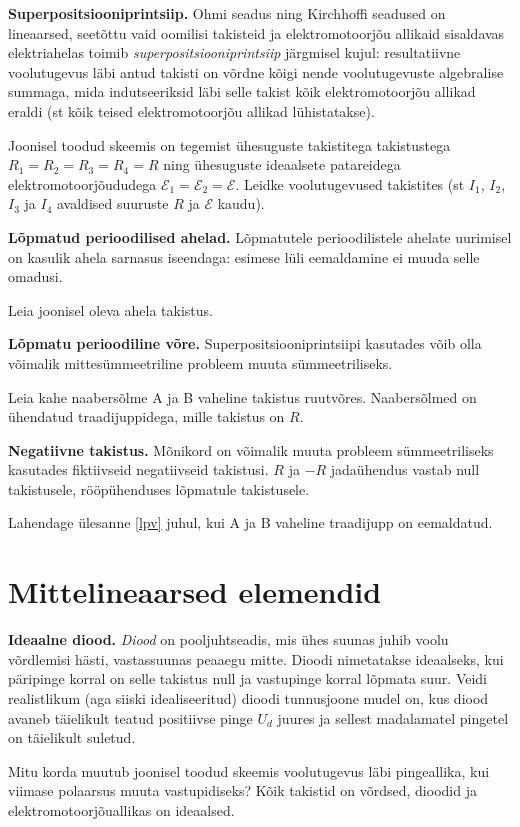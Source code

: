 \documentclass[a4paper,11pt,twocolumn]{article}
\begin{document}
\textbf{Superpositsiooniprintsiip.} Ohmi seadus ning Kirchhoffi seadused on lineaarsed, seetõttu vaid oomilisi takisteid ja elektromotoorjõu allikaid sisaldavas elektriahelas toimib \textit{superpositsiooniprintsiip} järgmisel kujul: resultatiivne voolutugevus läbi antud takisti on võrdne kõigi nende voolutugevuste algebralise summaga, mida indutseeriksid läbi selle takist kõik elektromotoorjõu allikad eraldi (st kõik teised elektromotoorjõu allikad lühistatakse).
\begin{question}[ela4][3.7cm]
	Joonisel toodud skeemis on tegemist ühesuguste takistitega takistustega $ R_1 = R_2 = R_3 = R_4 = R $ ning ühesuguste ideaalsete patareidega elektromotoorjõududega $ \mathcal{E}_1 = \mathcal{E}_2 = \mathcal{E} $. Leidke voolutugevused takistites (st $ I_1 $, $ I_2 $, $ I_3 $ ja $ I_4 $ avaldised suuruste $ R $ ja $ \mathcal{E} $ kaudu).
\end{question}

\textbf{Lõpmatud perioodilised ahelad.} Lõpmatutele perioodilistele ahelate uurimisel on kasulik ahela sarnasus iseendaga: esimese lüli eemaldamine ei muuda selle omadusi.
\begin{question}[ela7][9cm]
	Leia joonisel oleva ahela takistus.
\end{question}

\textbf{Lõpmatu perioodiline võre.} Superpositsiooniprintsiipi kasutades võib olla võimalik mittesümmeetriline probleem muuta sümmeetriliseks.
\begin{question}
	\label{lpv}
	Leia kahe naabersõlme A ja B vaheline takistus ruutvõres. Naabersõlmed on ühendatud traadijuppidega, mille takistus on \( R \).
\end{question}

\textbf{Negatiivne takistus.} Mõnikord on võimalik muuta probleem sümmeetriliseks kasutades fiktiivseid negatiivseid takistusi. \( R \) ja \( -R \) jadaühendus vastab null takistusele, rööpühenduses lõpmatule takistusele.
\begin{question}
	Lahendage ülesanne \ref{lpv} juhul, kui A ja B vaheline traadijupp on eemaldatud.
\end{question}

\section{Mittelineaarsed elemendid}
\textbf{Ideaalne diood.} \textit{Diood} on pooljuhtseadis, mis ühes suunas juhib voolu võrdlemisi hästi, vastassuunas peaaegu mitte. Dioodi nimetatakse ideaalseks, kui päripinge korral on selle takistus null ja vastupinge korral lõpmata suur. Veidi realistlikum (aga siiski idealiseeritud) dioodi tunnusjoone mudel on, kus diood avaneb täielikult teatud positiivse pinge \( U_d \) juures ja sellest madalamatel pingetel on täielikult suletud.
\begin{question}[ela9][\columnwidth]
	Mitu korda muutub joonisel toodud skeemis voolutugevus läbi pingeallika, kui viimase polaarsus muuta vastupidiseks?	Kõik takistid on võrdsed, dioodid ja elektromotoorjõuallikas on ideaalsed.
\end{question}
\end{document}
